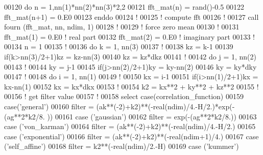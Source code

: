\begin{DoxyCode}
00120     \textcolor{keyword}{do} n = 1,nn(1)*nn(2)*nn(3)*2,2
00121        fft\_mat(n) = rand()-0.5
00122        fft\_mat(n+1) = 0.E0
00123     \textcolor{keyword}{enddo}
00124     \textcolor{comment}{!}
00125     \textcolor{comment}{! compute fft}
00126     \textcolor{comment}{!}
00127     call fourn (fft\_mat, nn, ndim, 1)
00128     \textcolor{comment}{!}
00129     \textcolor{comment}{! force zero mean}
00130     \textcolor{comment}{!}
00131     fft\_mat(1) = 0.E0 \textcolor{comment}{! real part}
00132     fft\_mat(2) = 0.E0 \textcolor{comment}{! imaginary part}
00133     \textcolor{comment}{!}
00134     n = 1
00135     \textcolor{comment}{!}
00136     \textcolor{keyword}{do} k = 1, nn(3)
00137        \textcolor{comment}{!}
00138        kz = k-1
00139        \textcolor{keyword}{if}(k>nn(3)/2+1)kz = kz-nn(3)
00140        kz = kz*dkz
00141        \textcolor{comment}{!}
00142        \textcolor{keyword}{do} j = 1, nn(2)
00143           \textcolor{comment}{!}
00144           ky = j-1
00145           \textcolor{keyword}{if}(j>nn(2)/2+1)ky = ky-nn(2)
00146           ky = ky*dky
00147           \textcolor{comment}{!}
00148           \textcolor{keyword}{do} i = 1, nn(1)
00149              \textcolor{comment}{!}
00150              kx = i-1
00151              \textcolor{keyword}{if}(i>nn(1)/2+1)kx = kx-nn(1)
00152              kx = kx*dkx
00153              \textcolor{comment}{!}
00154              k2 = kx**2 + ky**2 + kz**2
00155              \textcolor{comment}{!}
00156              \textcolor{comment}{! get filter value}
00157              \textcolor{comment}{!}
00158              \textcolor{keyword}{select} \textcolor{keyword}{case}(correlation\_function)
00159              \textcolor{keyword}{case}(\textcolor{stringliteral}{'general'}) 
00160                 filter = (ak**(-2)+k2)**(-\textcolor{keywordtype}{real}(ndim)/4.-H/2.)*exp(-(ag**2*k2/8.
      ))
00161              \textcolor{keyword}{case} (\textcolor{stringliteral}{'gaussian'}) 
00162                 filter = exp(-(ag**2*k2/8.))
00163              \textcolor{keyword}{case} (\textcolor{stringliteral}{'von\_karman'}) 
00164                 filter = (ak**(-2)+k2)**(-\textcolor{keywordtype}{real}(ndim)/4.-H/2.)
00165              \textcolor{keyword}{case} (\textcolor{stringliteral}{'exponential'}) 
00166                 filter = (ak**(-2)+k2)**(-\textcolor{keywordtype}{real}(ndim+1)/4.)
00167              \textcolor{keyword}{case} (\textcolor{stringliteral}{'self\_affine'}) 
00168                 filter = k2**(-\textcolor{keywordtype}{real}(ndim)/2.-H)
00169              \textcolor{keyword}{case} (\textcolor{stringliteral}{'kummer'}) 

\end{DoxyCode}
